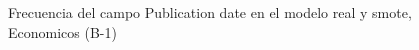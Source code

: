 \begin{figure}[H]
    \centering
    
    \caption{Frecuencia del campo Publication date en el modelo real y smote, Economicos (B-1)}
    \label{frecuency-Publication Date-smote-enc}
\end{figure}